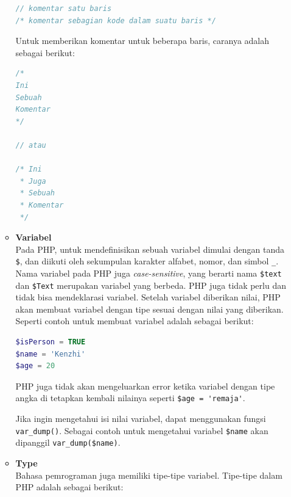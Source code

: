 \documentclass[a4paper,twoside]{article}
\begin{document}
\begin{enumerate}
\begin{itemize}
		            \begin{lstlisting}[language={php}, caption={Contoh Komentar Satu baris}, label={kode:5:commentoneline}]
// komentar satu baris
/* komentar sebagian kode dalam suatu baris */
			  		\end{lstlisting}

		            Untuk memberikan komentar untuk beberapa baris, caranya adalah sebagai berikut:

		            \begin{lstlisting}[language={php}, caption={Contoh Komentar Banyak Baris}, label={kode:5:commentmanyline}]
/*
Ini
Sebuah
Komentar
*/

// atau 

/* Ini
 * Juga
 * Sebuah
 * Komentar
 */
			  \end{lstlisting}

		      \item \textbf{Variabel} \\ %
		            Pada PHP, untuk mendefinisikan sebuah variabel dimulai dengan tanda \verb|$|, dan diikuti oleh sekumpulan karakter alfabet, nomor, dan simbol \verb|_|. Nama variabel pada PHP juga \textit{case-sensitive}, yang berarti nama \verb|$text| dan \verb|$Text| merupakan variabel yang berbeda.
		            PHP juga tidak perlu dan tidak bisa mendeklarasi variabel. Setelah variabel diberikan nilai, PHP akan membuat variabel dengan tipe sesuai dengan nilai yang diberikan. Seperti contoh untuk membuat variabel adalah sebagai berikut:

		            \begin{lstlisting}[language={php}, caption={Contoh Pembuatan Variabel}, label={kode:5:variabel_ex}]
$isPerson = TRUE
$name = 'Kenzhi'
$age = 20
					\end{lstlisting}

		            PHP juga tidak akan mengeluarkan error ketika variabel dengan tipe angka di tetapkan kembali nilainya seperti \verb|$age = 'remaja'|.

		            Jika ingin mengetahui isi nilai variabel, dapat menggunakan fungsi \verb|var_dump()|. Sebagai contoh untuk mengetahui variabel \verb|$name| akan dipanggil \verb|var_dump($name)|.

		      \item \textbf{Type} \\
		            Bahasa pemrograman juga memiliki tipe-tipe variabel. Tipe-tipe dalam PHP adalah sebagai berikut:


\end{itemize}
\end{enumerate}
\end{document}
